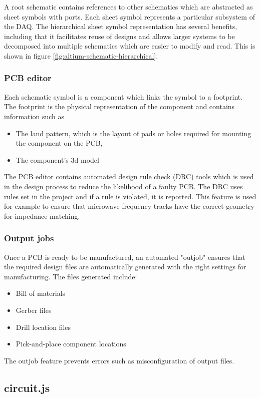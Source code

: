 \documentclass[a4paper,11pt]{article}
\begin{document}
A root schematic contains references to other schematics which are abstracted as sheet symbols with ports. Each sheet symbol represents a particular subsystem of the DAQ. The hierarchical sheet symbol representation has several benefits, including that it facilitates reuse of designs and allows larger systems to be decomposed into multiple schematics which are easier to modify and read. This is shown in figure \ref{fig:altium-schematic-hierarchical}.


\subsubsection{PCB editor}
Each schematic symbol is a component which links the symbol to a footprint. The footprint is the physical representation of the component and contains information such as
\begin{itemize}
  \item The land pattern, which is the layout of pads or holes required for mounting the component on the PCB,
  \item The component's 3d model
\end{itemize}

The PCB editor contains automated design rule check (DRC) tools which is used in the design process to reduce the likelihood of a faulty PCB. The DRC uses rules set in the project and if a rule is violated, it is reported. This feature is used for example to ensure that microwave-frequency tracks have the correct geometry for impedance matching.

\subsubsection{Output jobs}
Once a PCB is ready to be manufactured, an automated "outjob" ensures that the required design files are automatically generated with the right settings for manufacturing. The files generated include:
\begin{itemize}
  \item Bill of materials
  \item Gerber files
  \item Drill location files
  \item Pick-and-place component locations
\end{itemize}


The outjob feature prevents errors such as misconfiguration of output files.


\subsection{circuit.js}
\end{document}
